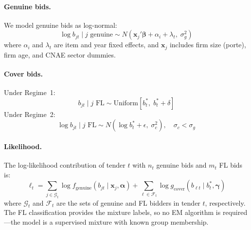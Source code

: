\paragraph{Genuine bids.} We model genuine bids as log-normal:
\begin{equation}
  \log b_{jt} \mid j \text{ genuine} \sim
  N\!\left(\mathbf{x}_j'\boldsymbol{\beta} + \alpha_i + \lambda_t,
  \; \sigma_g^2\right)
  \label{eq:genuine_dist}
\end{equation}
where $\alpha_i$ and $\lambda_t$ are item and year fixed effects, and
$\mathbf{x}_j$ includes firm size (porte), firm age, and CNAE sector
dummies.

\paragraph{Cover bids.} Under Regime~1:
\begin{equation}
  b_{jt} \mid j \text{ FL} \sim
  \text{Uniform}[b^*_t, \; b^*_t + \delta]
  \label{eq:cover_dist_r1}
\end{equation}
Under Regime~2:
\begin{equation}
  \log b_{jt} \mid j \text{ FL} \sim
  N\!\left(\log b^*_t + \epsilon, \; \sigma_c^2\right),
  \quad \sigma_c < \sigma_g
  \label{eq:cover_dist_r2}
\end{equation}

\paragraph{Likelihood.} The log-likelihood contribution of tender $t$
with $n_t$ genuine bids and $m_t$ FL bids is:
\begin{equation}
  \ell_t = \sum_{j \in \mathcal{G}_t} \log f_{\text{genuine}}(b_{jt}
  \mid \mathbf{x}_j, \boldsymbol{\alpha})
  + \sum_{\ell \in \mathcal{F}_t} \log g_{\text{cover}}(b_{\ell t}
  \mid b^*_t, \boldsymbol{\gamma})
  \label{eq:loglik}
\end{equation}
where $\mathcal{G}_t$ and $\mathcal{F}_t$ are the sets of genuine and
FL bidders in tender $t$, respectively. The FL classification provides
the mixture labels, so no EM algorithm is required---the model is a
supervised mixture with known group membership.

